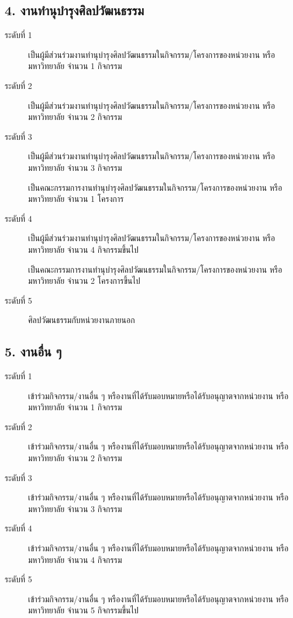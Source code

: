 \documentclass[a4paper,12pt,english]{sphinxmanual}
\begin{document}
\subsection{4. งานทำนุบำรุงศิลปวัฒนธรรม}
\label{\detokenize{submission_part1:id18}}\begin{description}
\item[{ระดับที่ 1}] \leavevmode
เป็นผู้มีส่วนร่วมงานทำนุบำรุงศิลปวัฒนธรรมในกิจกรรม/โครงการของหน่วยงาน หรือมหาวิทยาลัย จำนวน 1 กิจกรรม

\item[{ระดับที่ 2}] \leavevmode
เป็นผู้มีส่วนร่วมงานทำนุบำรุงศิลปวัฒนธรรมในกิจกรรม/โครงการของหน่วยงาน หรือมหาวิทยาลัย จำนวน 2 กิจกรรม

\item[{ระดับที่ 3}] \leavevmode
เป็นผู้มีส่วนร่วมงานทำนุบำรุงศิลปวัฒนธรรมในกิจกรรม/โครงการของหน่วยงาน หรือมหาวิทยาลัย จำนวน 3 กิจกรรม

 เป็นคณะกรรมการงานทำนุบำรุงศิลปวัฒนธรรมในกิจกรรม/โครงการของหน่วยงาน หรือมหาวิทยาลัย จำนวน 1 โครงการ

\item[{ระดับที่ 4}] \leavevmode
เป็นผู้มีส่วนร่วมงานทำนุบำรุงศิลปวัฒนธรรมในกิจกรรม/โครงการของหน่วยงาน หรือมหาวิทยาลัย จำนวน 4 กิจกรรมขึ้นไป

 เป็นคณะกรรมการงานทำนุบำรุงศิลปวัฒนธรรมในกิจกรรม/โครงการของหน่วยงาน หรือมหาวิทยาลัย จำนวน 2 โครงการขึ้นไป

\item[{ระดับที่ 5}] \leavevmode
{\hyperref[\detokenize{glossary:term-11}]{}} ศิลปวัฒนธรรมกับหน่วยงานภายนอก

\end{description}


\subsection{5. งานอื่น ๆ}
\label{\detokenize{submission_part1:id19}}\begin{description}
\item[{ระดับที่ 1}] \leavevmode
เข้าร่วมกิจกรรม/งานอื่น ๆ หรืองานที่ได้รับมอบหมายหรือได้รับอนุญาตจากหน่วยงาน หรือมหาวิทยาลัย จำนวน 1 กิจกรรม

\item[{ระดับที่ 2}] \leavevmode
เข้าร่วมกิจกรรม/งานอื่น ๆ หรืองานที่ได้รับมอบหมายหรือได้รับอนุญาตจากหน่วยงาน หรือมหาวิทยาลัย จำนวน 2 กิจกรรม

\item[{ระดับที่ 3}] \leavevmode
เข้าร่วมกิจกรรม/งานอื่น ๆ หรืองานที่ได้รับมอบหมายหรือได้รับอนุญาตจากหน่วยงาน หรือมหาวิทยาลัย จำนวน 3 กิจกรรม

\item[{ระดับที่ 4}] \leavevmode
เข้าร่วมกิจกรรม/งานอื่น ๆ หรืองานที่ได้รับมอบหมายหรือได้รับอนุญาตจากหน่วยงาน หรือมหาวิทยาลัย จำนวน 4 กิจกรรม

\item[{ระดับที่ 5}] \leavevmode
เข้าร่วมกิจกรรม/งานอื่น ๆ หรืองานที่ได้รับมอบหมายหรือได้รับอนุญาตจากหน่วยงาน หรือมหาวิทยาลัย จำนวน 5 กิจกรรมขึ้นไป

\end{description}
\end{document}
